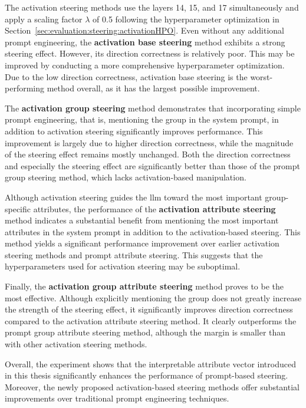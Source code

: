 The activation steering methods use the layers \num{14}, \num{15}, and \num{17} simultaneously and apply a scaling factor \(\lambda\) of \num{0.5} following the hyperparameter optimization in Section~\ref{sec:evaluation:steering:activationHPO}. Even without any additional prompt engineering, the \textbf{activation base steering} method exhibits a strong steering effect. However, its direction correctness is relatively poor. This may be improved by conducting a more comprehensive hyperparameter optimization. Due to the low direction correctness, activation base steering is the worst-performing method overall, as it has the largest possible improvement.

The \textbf{activation group steering} method demonstrates that incorporating simple prompt engineering, that is, mentioning the group in the system prompt, in addition to activation steering significantly improves performance. This improvement is largely due to higher direction correctness, while the magnitude of the steering effect remains mostly unchanged. Both the direction correctness and especially the steering effect are significantly better than those of the prompt group steering method, which lacks activation-based manipulation.

Although activation steering guides the \ac{llm} toward the most important group-specific attributes, the performance of the \textbf{activation attribute steering} method indicates a substantial benefit from mentioning the most important attributes in the system prompt in addition to the activation-based steering. This method yields a significant performance improvement over earlier activation steering methods and prompt attribute steering. This suggests that the hyperparameters used for activation steering may be suboptimal.

Finally, the \textbf{activation group attribute steering} method proves to be the most effective. Although explicitly mentioning the group does not greatly increase the strength of the steering effect, it significantly improves direction correctness compared to the activation attribute steering method. It clearly outperforms the prompt group attribute steering method, although the margin is smaller than with other activation steering methods.

Overall, the experiment shows  that the interpretable attribute vector introduced in this thesis significantly enhances the performance of prompt-based steering. Moreover, the newly proposed activation-based steering methods offer substantial improvements over traditional prompt engineering techniques.


